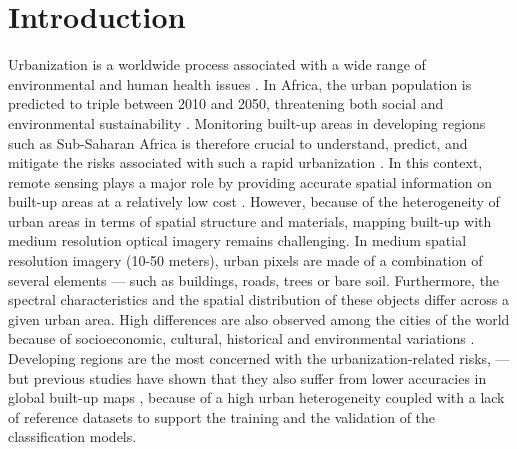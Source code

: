 \documentclass[remotesensing,article,submit,moreauthors,pdftex,10pt,a4paper]{Definitions/mdpi}
\begin{document}
\section{Introduction}

Urbanization is a worldwide process associated with a wide range of
environmental and human health issues \cite{Grimm2008, Dye2008}. In Africa, the
urban population is predicted to triple between 2010 and 2050, threatening both
social and environmental sustainability \cite{UN-Habitat2015}. Monitoring
built-up areas in developing regions such as Sub-Saharan Africa is therefore
crucial to understand, predict, and mitigate the risks associated with such a
rapid urbanization \cite{Linard2013}. In this context, remote sensing plays a
major role by providing accurate spatial information on built-up areas at a
relatively low cost \cite{Gamba2009, Wentz2014}. However, because of the
heterogeneity of urban areas in terms of spatial structure and materials,
mapping built-up with medium resolution optical imagery remains challenging. In
medium spatial resolution imagery (10-50 meters), urban pixels are made of a
combination of several elements --- such as buildings, roads, trees or bare
soil. Furthermore, the spectral characteristics and the spatial distribution of
these objects differ across a given urban area. High differences are also
observed among the cities of the world because of socioeconomic, cultural,
historical and environmental variations \cite{Forster1993, Small2001,
Small2005}. Developing regions are the most concerned with the
urbanization-related risks, --- but previous studies have shown that they also
suffer from lower accuracies in global built-up maps \cite{Potere2009}, because
of a high urban heterogeneity coupled with a lack of reference datasets to
support the training and the validation of the classification models.
\end{document}
